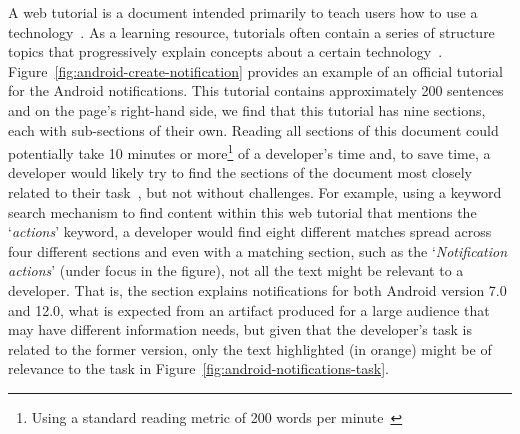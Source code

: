 A web tutorial is a document intended primarily to teach users how to use 
a technology~\cite{arya2020}. 
As a learning resource, tutorials often contain a series of structure topics 
that progressively explain concepts about a certain technology~\cite{Jiang2016b, Jiang2017}. 
Figure~\ref{fig:android-create-notification} provides an example 
of an official tutorial for the Android notifications. 
This tutorial contains  approximately 200 sentences
and on the page's right-hand side, we find that this tutorial
has nine sections, each with sub-sections of their own. 
Reading all sections of this document could potentially 
take 10 minutes or more\footnote{Using a standard reading metric of 200 words per minute~\cite{Just1980}} of a developer's time 
and, to save time, a developer would likely try to find the sections of the document
most closely related to their task~\cite{Li2013}, but not without challenges.
For example, using a keyword search mechanism to find content within this web tutorial 
that mentions the `\textit{actions}' keyword, 
a developer would find eight different matches spread across four different sections
and even with a matching section, 
such as the `\textit{Notification actions}'
 (under focus in the figure), 
not all the text might be relevant to 
a developer.
That is, 
the section explains 
notifications for both Android version 7.0 and 12.0, what is expected from an artifact produced for a large audience
that may have different information needs, but given that the developer's task is related to the former version,
only the text highlighted (in orange)
might be of relevance to the task in Figure~\ref{fig:android-notifications-task}.






